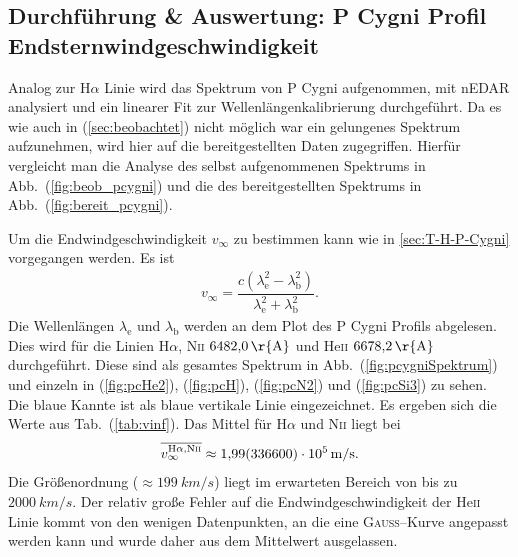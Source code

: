 \subsection{Durchführung \& Auswertung: P Cygni Profil\\Endsternwindgeschwindigkeit}
Analog zur H$\alpha $ Linie wird das Spektrum von P Cygni aufgenommen, mit nEDAR analysiert und ein linearer Fit zur Wellenlängenkalibrierung durchgeführt.
Da es wie auch in (\ref{sec:beobachtet}) nicht möglich war ein gelungenes Spektrum aufzunehmen, wird hier auf die bereitgestellten Daten zugegriffen.
Hierfür vergleicht man die Analyse des selbst aufgenommenen Spektrums in Abb.\ (\ref{fig:beob_pcygni}) und die des bereitgestellten Spektrums in Abb.\ (\ref{fig:bereit_pcygni}).

Um die Endwindgeschwindigkeit $v_\infty$ zu bestimmen kann wie in \ref{sec:T-H-P-Cygni} vorgegangen werden.
Es ist
\begin{align} 
  v_\infty=\dfrac{c\left(\lambda _\text{e}^2-\lambda _\text{b}^2\right)}{\lambda _\text{e}^2+\lambda _\text{b}^2}
.\end{align} 
Die Wellenlängen $\lambda _\text{e}$ und $\lambda _\text{b}$ werden an dem Plot des P Cygni Profils abgelesen.
Dies wird für die Linien H$\alpha$, N\textsc{ii} $\SI{6482,0}{\r{A}}$ und He\textsc{ii} $\SI{6678,2}{\r{A}}$ durchgeführt.  
Diese sind als gesamtes Spektrum in Abb.\ (\ref{fig:pcygniSpektrum}) und einzeln in (\ref{fig:pcHe2}), (\ref{fig:pcH}), (\ref{fig:pcN2}) und (\ref{fig:pcSi3}) zu sehen.
Die blaue Kannte ist als blaue vertikale Linie eingezeichnet.
Es ergeben sich die Werte aus Tab.\ (\ref{tab:vinf}).
Das Mittel für H$\alpha $ und N\textsc{ii} liegt bei
\begin{align} 
  \overline{v_\infty^{\text{H}\alpha ,\text{N}\textsc{ii}}}\approx \SI{1.99+-3366e+5}{m/s}
.\end{align} 
Die Größenordnung ($\approx \SI{199}{km/s}$) liegt im erwarteten Bereich von bis zu $\SI{2000}{km/s}$.
Der relativ große Fehler auf die Endwindgeschwindigkeit der He\textsc{ii} Linie kommt von den wenigen Datenpunkten, an die eine \textsc{Gauss}--Kurve angepasst werden kann und wurde daher aus dem Mittelwert ausgelassen.

